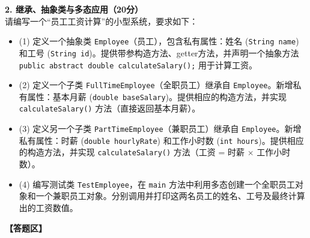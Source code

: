\documentclass[a3paper, landscape, 11pt, twocolumn]{article}
\begin{document}
\textbf{2. 继承、抽象类与多态应用（20分）}\\
请编写一个“员工工资计算”的小型系统，要求如下：
\begin{itemize}
	\item (1) 定义一个抽象类 \texttt{Employee}（员工），包含私有属性：姓名 (\texttt{String name}) 和工号 (\texttt{String id})。提供带参构造方法、getter方法，并声明一个抽象方法 \texttt{public abstract double calculateSalary();} 用于计算工资。
	\item (2) 定义一个子类 \texttt{FullTimeEmployee}（全职员工）继承自 \texttt{Employee}。新增私有属性：基本月薪 (\texttt{double baseSalary})。提供相应的构造方法，并实现 \texttt{calculateSalary()} 方法（直接返回基本月薪）。
	\item (3) 定义另一个子类 \texttt{PartTimeEmployee}（兼职员工）继承自 \texttt{Employee}。新增私有属性：时薪 (\texttt{double hourlyRate}) 和工作小时数 (\texttt{int hours})。提供相应的构造方法，并实现 \texttt{calculateSalary()} 方法（工资 = 时薪 $\times$ 工作小时数）。
	\item (4) 编写测试类 \texttt{TestEmployee}，在 \texttt{main} 方法中利用多态创建一个全职员工对象和一个兼职员工对象。分别调用并打印这两名员工的姓名、工号及最终计算出的工资数值。
\end{itemize}
\vspace{1em}
\textbf{【答题区】}


\end{document}
